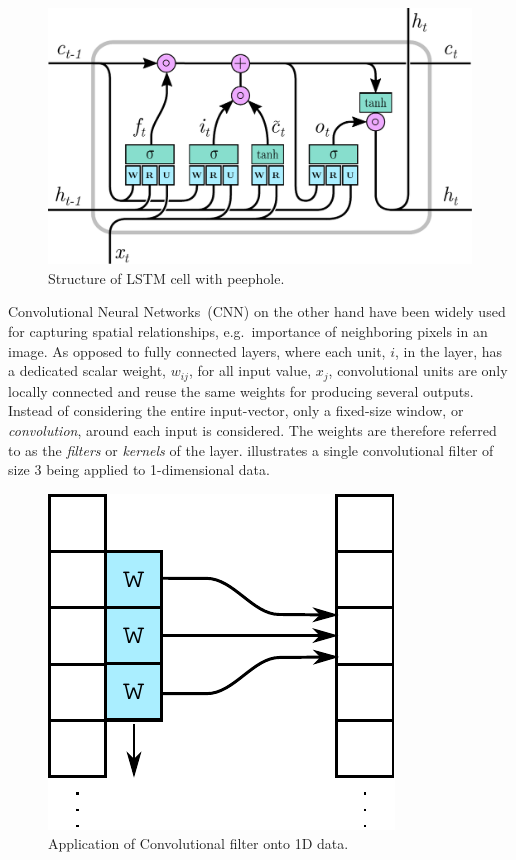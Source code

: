﻿\documentclass[preprint,11pt,5p,twocolumn]{elsarticle}
\begin{document}
\begin{figure}[!ht]
  \centering
  \includegraphics[scale=.45]{drawings/lstm-peepholes.pdf}
  \caption{Structure of LSTM cell with peephole.}
  \label{fig:lstm-peepholes}
\end{figure}

Convolutional Neural Networks~(CNN) on the other hand have been widely used for capturing spatial relationships, e.g.\ importance of neighboring pixels in an image. As opposed to fully connected layers, where each unit, $i$, in the layer, has a dedicated scalar weight, $w_{ij}$, for all input value, $x_j$, convolutional units are only locally connected and reuse the same weights for producing several outputs. Instead of considering the entire input-vector, only a fixed-size window, or \emph{convolution}, around each input is considered. The weights are therefore referred to as the \emph{filters} or \emph{kernels} of the layer.  illustrates a single convolutional filter of size $3$ being applied to 1-dimensional data.

\begin{figure}[!ht]
  \centering
  \includegraphics[scale=.5]{drawings/conv.pdf}
  \caption{Application of Convolutional filter onto 1D data.}
  \label{fig:conv}
\end{figure}
\end{document}
